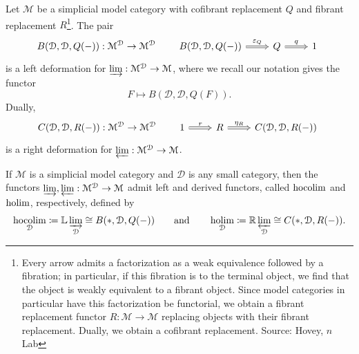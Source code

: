\begin{theorem}\label{thm:5.1}
	Let $\mathcal{M} $ be a simplicial model category with cofibrant replacement $Q$ and fibrant replacement $R$\footnote{Every arrow admits a factorization as a weak equivalence followed by a fibration; in particular, if this fibration is to the terminal object, we find that the object is weakly equivalent to a fibrant object. Since model categories in particular have this factorization be functorial, we obtain a fibrant replacement functor $R : \mathcal{M}  \to \mathcal{M} $ replacing objects with their fibrant replacement. Dually, we obtain a cofibrant replacement. Source: Hovey, $n$Lab}. The pair
	\[
		B(\mathcal{D} ,\mathcal{D} ,Q(-)): \mathcal{M} ^{\mathcal{D} }  \to \mathcal{M} ^{\mathcal{D} } \qquad
		\begin{tikzcd}
			B(\mathcal{D} ,\mathcal{D} ,Q(-))\ar[" \varepsilon _Q ", Rightarrow, r] & Q\ar[" q ", Rightarrow, r] & 1
		\end{tikzcd}
	\]
	is a left deformation for $\varinjlim : \mathcal{M} ^{\mathcal{D} }  \to \mathcal{M} $, where we recall our notation gives the functor
	\[
		F\mapsto B(\mathcal{D} ,\mathcal{D} ,Q(F))
	.\]
	Dually,
	\[
		C(\mathcal{D} ,\mathcal{D} ,R(-)): \mathcal{M} ^{\mathcal{D} }  \to \mathcal{M} ^{\mathcal{D} } \qquad
		\begin{tikzcd}
			1\ar[" r ", Rightarrow, r] & R\ar[" \eta_R ", Rightarrow, r] & C(\mathcal{D} ,\mathcal{D} ,R(-))
		\end{tikzcd}
	\]
	is a right deformation for $\varprojlim : \mathcal{M} ^{\mathcal{D} }  \to \mathcal{M} $.
\end{theorem}
\begin{corollary}\label{cor:5.1}
	If $\mathcal{M} $ is a simplicial model category and $\mathcal{D} $ is any small category, then the functors $\varinjlim ,\varprojlim : \mathcal{M} ^{\mathcal{D} }  \to \mathcal{M} $ admit left and derived functors, called $\operatorname*{hocolim} $ and $\operatorname*{holim} $, respectively, defined by
	\[
		\operatorname*{hocolim}_\mathcal{D}  \coloneqq \mathbb{L} \varinjlim_\mathcal{D} \cong B(*,\mathcal{D} ,Q(-))\qquad \text{and} \qquad \operatorname*{holim}_\mathcal{D} \coloneqq \mathbb{R} \varprojlim _\mathcal{D} \cong C(*,\mathcal{D} ,R(-))
	.\]
\end{corollary}
